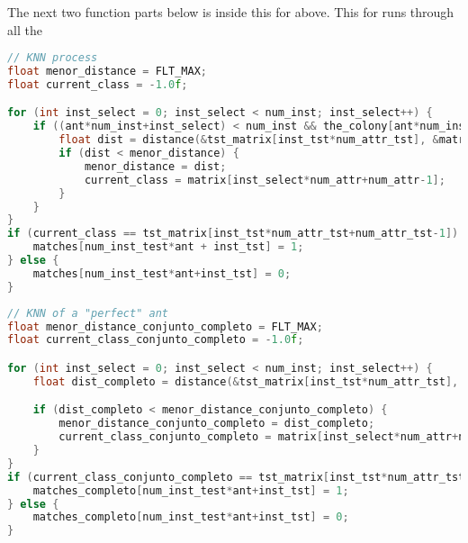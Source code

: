 The next two function parts below is inside this for above.
This for runs through all the

\begin{lstlisting}[language=c++]
// KNN process
float menor_distance = FLT_MAX;
float current_class = -1.0f;

for (int inst_select = 0; inst_select < num_inst; inst_select++) {
    if ((ant*num_inst+inst_select) < num_inst && the_colony[ant*num_inst+inst_select] == 1) {
        float dist = distance(&tst_matrix[inst_tst*num_attr_tst], &matrix[inst_select*num_attr], num_attr_tst-1);
        if (dist < menor_distance) {
            menor_distance = dist;
            current_class = matrix[inst_select*num_attr+num_attr-1];
        }
    }
}
if (current_class == tst_matrix[inst_tst*num_attr_tst+num_attr_tst-1]) {
    matches[num_inst_test*ant + inst_tst] = 1;
} else {
    matches[num_inst_test*ant+inst_tst] = 0;
}
\end{lstlisting}

\begin{lstlisting}[language=c++]
// KNN of a "perfect" ant
float menor_distance_conjunto_completo = FLT_MAX;
float current_class_conjunto_completo = -1.0f;

for (int inst_select = 0; inst_select < num_inst; inst_select++) {
    float dist_completo = distance(&tst_matrix[inst_tst*num_attr_tst], &matrix[inst_select*num_attr], num_attr_tst-1);

    if (dist_completo < menor_distance_conjunto_completo) {
        menor_distance_conjunto_completo = dist_completo;
        current_class_conjunto_completo = matrix[inst_select*num_attr+num_attr-1];
    }
}
if (current_class_conjunto_completo == tst_matrix[inst_tst*num_attr_tst+num_attr_tst-1]) {
    matches_completo[num_inst_test*ant+inst_tst] = 1;
} else {
    matches_completo[num_inst_test*ant+inst_tst] = 0;
}
\end{lstlisting}

